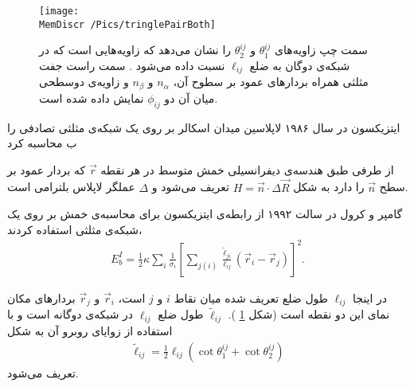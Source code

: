 \begin{figure}[h]
\begin{center}
\texttt{[image: \\MemDiscr /Pics/tringlePairBoth]}
\caption{
سمت چپ زاویه‌های 
$\theta_1^{ij}$
و
$\theta_2^{ij}$
را نشان می‌دهد که زاویه‌هایی است که در شبکه‌ی دوگان به ضلع
$\ell_{ij}$
نسبت داده می‌شود
\cite{Meyer2003}
. سمت راست جفت مثلثی همراه بردار‌های عمود بر سطوح آن،
$n_\alpha$
و
$n_\beta$
و زاویه‌ی دوسطحی میان آن دو
$\phi_{ij}$
نمایش داده شده ‌است.
}
\label{fig:trianglePairAngle}
\end{center}
\end{figure}

ایتزیکسون
در سال ۱۹۸۶ لاپلاسین میدان اسکالر بر روی یک شبکه‌ی مثلثی تصادفی را ب محاسبه کرد
\cite{Itzykson1986}

از طرفی طبق هندسه‌ی دیفرانسیلی  خمش متوسط در هر نقطه 
$\vec r$
که بردار عمود بر سطح 
$\vec n$
را دارد به شکل 
$H=\vec n\cdot\Delta \vec R$
تعریف می‌شود 
\cite{Gompper1996}
و 
$\Delta$
عملگر لاپلاس بلترامی 
است. 


گامپر و کرول در سالت ۱۹۹۲ از رابطه‌ی ایتزیکسون برای محاسبه‌ی خمش بر روی یک شبکه‌ی مثلثی استفاده کردند،
\begin{eqnarray}
E_{b}^{I}=\frac{1}{2}\kappa\sum_{i}\frac{1}{\sigma_i}\left[\sum_{j(i)}\frac{\tilde\ell_{ji}}{\ell_{ij}}(\vec r_i-\vec r_j)\right]^2.
\label{eq:ItzyksonPotential}
\end{eqnarray}

در اینجا 
$\ell_{ij}$
طول ضلع تعریف شده میان نقاط 
$i$
و
$j$
است، 
$\vec r_i$
و
$\vec r_j$
بردار‌های مکان نمای این دو نقطه‌ است (شکل
\ref{fig:trianglePairAngle}
). 
$\tilde\ell_{ij}$
طول ضلع 
$\ell_{ij}$
در شبکه‌ی دوگانه‌ 
است و با استفاده از زوایا‌ی روبرو آن به شکل 
\begin{eqnarray}
\tilde\ell_{ij}=\frac{1}{2}\ell_{ij}(\cot\theta_1^{ij}+\cot\theta_2^{ij})
\label{eq:dualLattice}
\end{eqnarray}
تعریف می‌شود.

